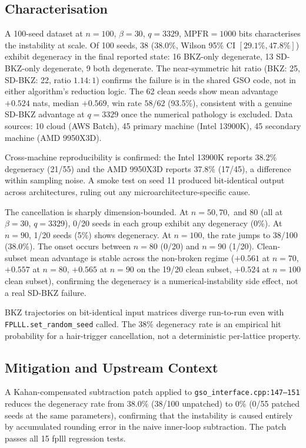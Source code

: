 \documentclass[journal=cic,version=preprint]{iacrj}
\begin{document}
\subsection{Characterisation}

A 100-seed dataset at $n=100$, $\beta=30$, $q=3329$, $\mathrm{MPFR}=1000$ bits characterises the instability at scale. Of 100 seeds, 38 (38.0\%, Wilson 95\% CI $[29.1\%, 47.8\%]$) exhibit degeneracy in the final reported state: 16 BKZ-only degenerate, 13 SD-BKZ-only degenerate, 9 both degenerate. The near-symmetric hit ratio (BKZ: 25, SD-BKZ: 22, ratio $1.14{:}1$) confirms the failure is in the shared GSO code, not in either algorithm's reduction logic. The 62 clean seeds show mean advantage $+0.524$ nats, median $+0.569$, win rate $58/62$ (93.5\%), consistent with a genuine SD-BKZ advantage at $q=3329$ once the numerical pathology is excluded. Data sources: 10 cloud (AWS Batch), 45 primary machine (Intel 13900K), 45 secondary machine (AMD 9950X3D).

Cross-machine reproducibility is confirmed: the Intel 13900K reports 38.2\% degeneracy (21/55) and the AMD 9950X3D reports 37.8\% (17/45), a difference within sampling noise. A smoke test on seed 11 produced bit-identical output across architectures, ruling out any microarchitecture-specific cause.

The cancellation is sharply dimension-bounded. At $n=50, 70,$ and $80$ (all at $\beta=30$, $q=3329$), 0/20 seeds in each group exhibit any degeneracy (0\%). At $n=90$, 1/20 seeds (5\%) shows degeneracy. At $n=100$, the rate jumps to 38/100 (38.0\%). The onset occurs between $n=80$ (0/20) and $n=90$ (1/20). Clean-subset mean advantage is stable across the non-broken regime ($+0.561$ at $n=70$, $+0.557$ at $n=80$, $+0.565$ at $n=90$ on the 19/20 clean subset, $+0.524$ at $n=100$ clean subset), confirming the degeneracy is a numerical-instability side effect, not a real SD-BKZ failure.

BKZ trajectories on bit-identical input matrices diverge run-to-run even with \texttt{FPLLL.\allowbreak set\_\allowbreak random\_\allowbreak seed} called. The 38\% degeneracy rate is an empirical hit probability for a hair-trigger cancellation, not a deterministic per-lattice property.

\subsection{Mitigation and Upstream Context}

A Kahan-compensated subtraction patch applied to \texttt{gso\_interface.cpp:147--151} reduces the degeneracy rate from 38.0\% (38/100 unpatched) to 0\% (0/55 patched seeds at the same parameters), confirming that the instability is caused entirely by accumulated rounding error in the naive inner-loop subtraction. The patch passes all 15 fplll regression tests.
\end{document}
